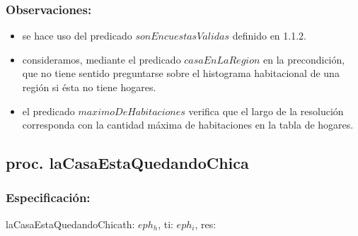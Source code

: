 \documentclass[a4paper]{article}
\begin{document}
    \subsubsection{Observaciones:}
        \begin{itemize}
            \item se hace uso del predicado $sonEncuestasValidas$ definido en 1.1.2.
            \item consideramos, mediante el predicado $casaEnLaRegion$ en la precondici\'on, que no tiene sentido preguntarse sobre el 
            histograma habitacional de una regi\'on si \'esta no tiene hogares.
            \item el predicado $maximoDeHabitaciones$ verifica que el largo de la resolución corresponda con la cantidad 
            máxima de habitaciones en la tabla de hogares.
        \end{itemize}


\pagebreak
\subsection{proc. laCasaEstaQuedandoChica}

    \subsubsection{Especificaci\'on:}
        \begin{proc}{laCasaEstaQuedandoChica}{\In th: $eph_{h}$, \In ti: $eph_{i}$, \Out res: \TLista{\float}}{}
        \end{proc}
\end{document}
